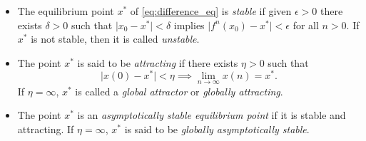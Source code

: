 \documentclass{article}
\begin{document}
\begin{defn}
    \begin{itemize}
        \item [(a)] The equilibrium point \(x^*\) of \eqref{eq:difference_eq} is \emph{stable} if given \(\epsilon > 0\) there exists \(\delta > 0\) such that \(\vert x_0 - x^* \vert < \delta\) implies \(\vert f^n(x_0) - x^* \vert < \epsilon\) for all \(n > 0\). If \(x^*\) is not stable, then it is called \emph{unstable}.
        \item [(b)] The point \(x^*\) is said to be \emph{attracting} if there exists \(\eta > 0\) such that \[\vert x(0) - x^* \vert < \eta \implies \lim_{n\to\infty} x(n) = x^*.\] If \(\eta = \infty\), \(x^*\) is called a \emph{global attractor} or \emph{globally attracting}.
        \item [(c)] The point \(x^*\) is an \emph{asymptotically stable equilibrium point} if it is stable and attracting. If \(\eta = \infty\), \(x^*\) is said to be \emph{globally asymptotically stable}.
    \end{itemize}
\end{defn}
\end{document}
